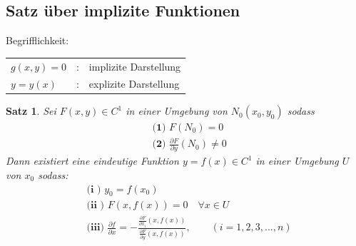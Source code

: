 \documentclass[12pt,a4paper]{article}%
\newtheorem{satz}{Satz}[section]
\numberwithin{equation}{section}
\newcommand{\diffp}{\partial}
\numberwithin{equation}{subsection}
\begin{document}
  \subsection{Satz über implizite Funktionen}
  Begrifflichkeit: \qquad
  \begin{tabular}{l l l}
    $g(x,y) = 0$ &: & implizite Darstellung \\
    $y = y(x)$ &: & explizite Darstellung  
  \end{tabular}
  \begin{satz}
    Sei $F(x,y) \in C^1$ in einer Umgebung von $N_0(x_0,y_0)$ sodass
    \begin{align*}
      &\textbf{(1) } F(N_0) = 0 \\
      &\textbf{(2) } \frac{\diffp F}{\diffp y}(N_0) \neq 0
    \end{align*}     
    Dann existiert eine eindeutige Funktion $y = f(x) \in C^1$ in einer Umgebung $U$ von $x_0$ sodass:
    \begin{align*}
      &\textbf{(i  ) } y_0 = f(x_0) \\
      &\textbf{(ii ) } F\left(x,f(x)\right) = 0 \quad \forall x \in U \\
      &\textbf{(iii) } \frac{\diffp f}{\diffp x} = - \frac{\frac{\diffp F}{\diffp x_i} \left(x, f(x)\right)}{\frac{\diffp F}{\diffp y}\left(x,f(x)\right)} ,\qquad (i = 1,2,3,...,n)
    \end{align*}
  \end{satz}
\end{document}
